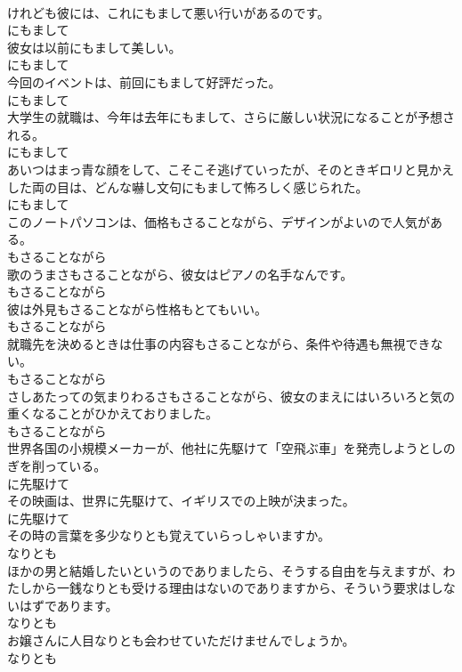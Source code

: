 \documentclass[8pt]{extreport}
\begin{document}
\begin{CJK}{UTF8}{min}
\\	けれども彼には、これにもまして悪い行いがあるのです。	
\\	にもまして
\\	彼女は以前にもまして美しい。	
\\	にもまして
\\	今回のイベントは、前回にもまして好評だった。	
\\	にもまして
\\	大学生の就職は、今年は去年にもまして、さらに厳しい状況になることが予想される。	
\\	にもまして
\\	あいつはまっ青な顔をして、こそこそ逃げていったが、そのときギロリと見かえした両の目は、どんな嚇し文句にもまして怖ろしく感じられた。	
\\	にもまして
\\	このノートパソコンは、価格もさることながら、デザインがよいので人気がある。	
\\	もさることながら
\\	歌のうまさもさることながら、彼女はピアノの名手なんです。	
\\	もさることながら
\\	彼は外見もさることながら性格もとてもいい。	
\\	もさることながら
\\	就職先を決めるときは仕事の内容もさることながら、条件や待遇も無視できない。	
\\	もさることながら
\\	さしあたっての気まりわるさもさることながら、彼女のまえにはいろいろと気の重くなることがひかえておりました。	
\\	もさることながら
\\	世界各国の小規模メーカーが、他社に先駆けて「空飛ぶ車」を発売しようとしのぎを削っている。	
\\	に先駆けて
\\	その映画は、世界に先駆けて、イギリスでの上映が決まった。	
\\	に先駆けて
\\	その時の言葉を多少なりとも覚えていらっしゃいますか。	
\\	なりとも
\\	ほかの男と結婚したいというのでありましたら、そうする自由を与えますが、わたしから一銭なりとも受ける理由はないのでありますから、そういう要求はしないはずであります。	
\\	なりとも
\\	お嬢さんに人目なりとも会わせていただけませんでしょうか。	
\\	なりとも

\end{CJK}
\end{document}
